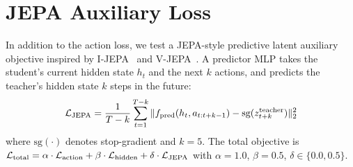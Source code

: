 \section{JEPA Auxiliary Loss}
\label{sec:jepa-setup}

In addition to the action loss, we test a JEPA-style predictive latent auxiliary objective inspired by I-JEPA~\citep{assran2023ijepa} and V-JEPA~\citep{bardes2024vjepa}.
A predictor MLP takes the student's current hidden state $h_t$ and the next $k$ actions, and predicts the teacher's hidden state $k$ steps in the future:
\begin{equation}
  \mathcal{L}_\text{JEPA} = \frac{1}{T-k} \sum_{t=1}^{T-k} \| f_\text{pred}(h_t, a_{t:t+k-1}) - \text{sg}(z_{t+k}^\text{teacher}) \|_2^2
\end{equation}
where $\text{sg}(\cdot)$ denotes stop-gradient and $k=5$.
The total objective is $\mathcal{L}_\text{total} = \alpha \cdot \mathcal{L}_\text{action} + \beta \cdot \mathcal{L}_\text{hidden} + \delta \cdot \mathcal{L}_\text{JEPA}$ with $\alpha=1.0$, $\beta=0.5$, $\delta \in \{0.0, 0.5\}$.
